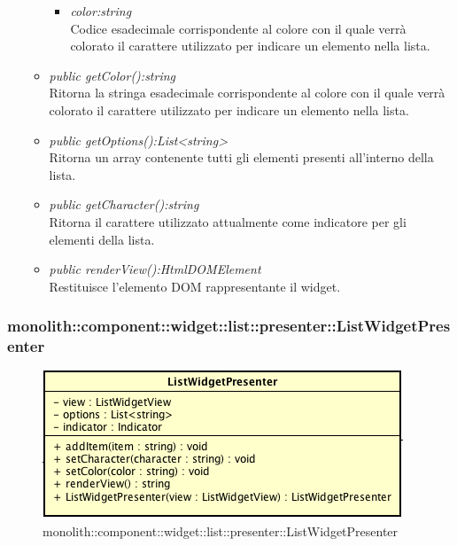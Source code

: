 \begin{itemize}
\begin{itemize}
\begin{itemize}
		\item \textit{color:string}\\
		Codice esadecimale corrispondente al colore con il quale verrà colorato il carattere utilizzato per indicare un elemento nella lista.
		\end{itemize} 
	\item \textit{public getColor():string}\\
	Ritorna la stringa esadecimale corrispondente al colore con il quale verrà colorato il carattere utilizzato per indicare un elemento nella lista.
	\item \textit{public getOptions():List<string>}\\
	Ritorna un array contenente tutti gli elementi presenti all'interno della lista.
	\item \textit{public getCharacter():string}\\
	Ritorna il carattere utilizzato attualmente come indicatore per gli elementi della lista.
	\item \textit{public renderView():HtmlDOMElement}\\
	Restituisce l'elemento DOM rappresentante il widget.
	\end{itemize}
\end{itemize}

\subsubsection{monolith::component::widget::list::presenter::ListWidgetPresenter}

\label{monolith::component::widget::list::presenter::ListWidgetPresenter}
\begin{figure}[H]
	\centering
	\includegraphics[scale=0.5]{Sezioni/SottosezioniST/img/ListWidgetPresenter.png}
	\caption{monolith::component::widget::list::presenter::ListWidgetPresenter}
\end{figure}

